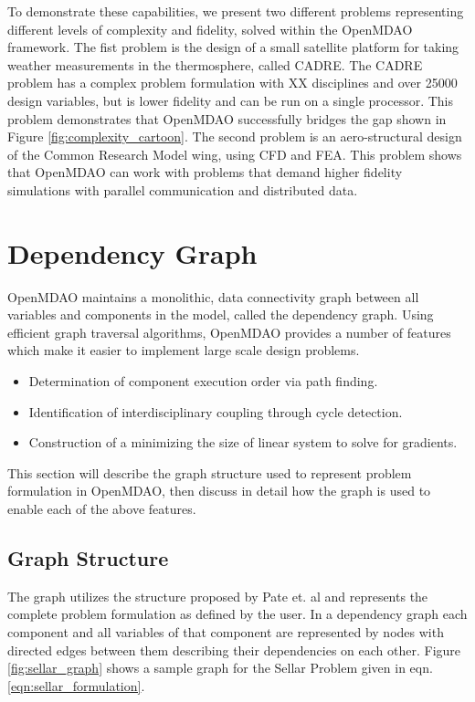 \documentclass[]{aiaa-tc} %
\begin{document}
    To demonstrate these capabilities, we present two different problems representing different levels of 
    complexity and fidelity, solved within the OpenMDAO framework. The fist problem is the design of a small 
    satellite platform for taking weather measurements in the thermosphere, called CADRE. The CADRE problem has a 
    complex problem formulation with XX disciplines and over 25000 design variables, but is lower fidelity and can 
    be run on a single processor. This problem demonstrates that OpenMDAO successfully bridges the gap shown 
    in Figure \ref{fig:complexity_cartoon}. The second problem is an aero-structural design of the Common Research 
    Model wing, using CFD and FEA. This problem shows that OpenMDAO can work with problems that demand higher fidelity 
    simulations with parallel communication and distributed data. 

  \section{Dependency Graph}

    OpenMDAO maintains a monolithic, data connectivity graph between all 
    variables and components in the model, called the dependency graph.
    Using efficient graph traversal algorithms, OpenMDAO provides a number of 
    features which make it easier to implement large scale design problems. 

    \begin{itemize}
      \item Determination of component execution order via path finding.
      \item Identification of interdisciplinary coupling through cycle detection.
      \item Construction of a minimizing the size of linear system to solve for gradients.
    \end{itemize}

    This section will describe the graph structure used to represent problem formulation in OpenMDAO, 
    then discuss in detail how the graph is used to enable each of the above features. 
      

    \subsection{Graph Structure}
    The graph utilizes the structure proposed by 
    Pate et. al \cite{graph_problem2013} and represents the complete problem formulation as 
    defined by the user. In a dependency graph each component and all variables of that component are 
    represented by nodes with directed edges between them describing their dependencies on each other. 
    Figure \ref{fig:sellar_graph} shows a sample graph for the Sellar Problem \cite{AIAA:sellar} 
    given in eqn. \ref{eqn:sellar_formulation}.  
\end{document}
